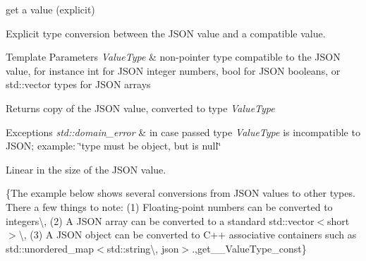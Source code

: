 get a value (explicit) 

Explicit type conversion between the J\-S\-O\-N value and a compatible value.


\begin{DoxyTemplParams}{Template Parameters}
{\em Value\-Type} & non-\/pointer type compatible to the J\-S\-O\-N value, for instance {\ttfamily int} for J\-S\-O\-N integer numbers, {\ttfamily bool} for J\-S\-O\-N booleans, or {\ttfamily std\-::vector} types for J\-S\-O\-N arrays\\
\hline
\end{DoxyTemplParams}
\begin{DoxyReturn}{Returns}
copy of the J\-S\-O\-N value, converted to type {\itshape Value\-Type} 
\end{DoxyReturn}

\begin{DoxyExceptions}{Exceptions}
{\em std\-::domain\-\_\-error} & in case passed type {\itshape Value\-Type} is incompatible to J\-S\-O\-N; example\-: {\ttfamily \char`\"{}type must be object, but is null\char`\"{}}\\
\hline
\end{DoxyExceptions}
Linear in the size of the J\-S\-O\-N value.

\{The example below shows several conversions from J\-S\-O\-N values to other types. There a few things to note\-: (1) Floating-\/point numbers can be converted to integers\textbackslash{}, (2) A J\-S\-O\-N array can be converted to a standard {\ttfamily std\-::vector$<$short$>$}\textbackslash{}, (3) A J\-S\-O\-N object can be converted to C++ associative containers such as {\ttfamily std\-::unordered\-\_\-map$<$std\-::string\textbackslash{}, json$>$}.,get\-\_\-\-\_\-\-Value\-Type\-\_\-const\}

